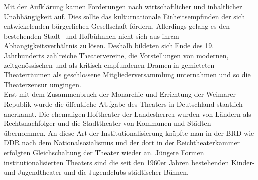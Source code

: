 \documentclass[ngerman, a4paper, twoside]{scrbook}%
\begin{document}
	Mit der Aufklärung kamen Forderungen nach wirtschaftlicher und inhaltlicher Unabhängigkeit auf. Dies sollte das kulturnationale Einheitsempfinden der sich entwickelenden bürgerlichen Gesellschaft fördern. Allerdings gelang es den bestehenden Stadt- und Hofbühnnen nicht sich aus ihrem Abhangigkeitsverhältnis zu lösen. Deshalb bildeten sich Ende des 19. Jahrhunderts zahlreiche Theatervereine, die Vorstellungen von modernen, zeitgenössischen und als kritisch empfundenen Dramen in gemieteten Theaterräumen als geschlossene Mitgliederversammlung unternahmen und so die Theaterzensur umgingen.\\

	Erst mit dem Zusammenbruch der Monarchie und Errichtung der Weimarer Republik wurde die öffentliche AUfgabe des Theaters in Deutschland staatlich anerkannt. Die ehemaligen Hoftheater der Landesherren wurden von Ländern als Rechtsnachfolger und die Stadttheater von Kommunen und Städten übernommen. An diese Art der Institutionalisierung knüpfte man in der BRD wie DDR nach dem Nationalsozialismus und der dort in der Reichtheaterkammer erfolgten Gleichschaltung der Theater wieder an. Jüngere Formen institutionalisierten Theaters sind die seit den 1960er Jahren bestehenden Kinder- und Jugendtheater und die Jugendclubs städtischer Bühnen.
\end{document}

